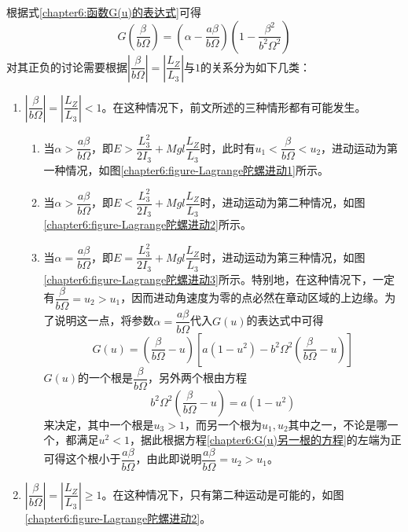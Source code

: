 根据式\eqref{chapter6:函数G(u)的表达式}可得
\begin{equation}
	G\left(\dfrac{\beta}{b\varOmega}\right)= \left(\alpha-\frac{a\beta}{b\varOmega}\right)\left(1-\dfrac{\beta^2}{b^2\varOmega^2}\right)
\end{equation}
对其正负的讨论需要根据$\left|\dfrac{\beta}{b\varOmega}\right|=\left|\dfrac{L_Z}{L_3}\right|$与$1$的关系分为如下几类：
\begin{enumerate}
\item $\left|\dfrac{\beta}{b\varOmega}\right|=\left|\dfrac{L_Z}{L_3}\right|<1$。在这种情况下，前文所述的三种情形都有可能发生。
\begin{enumerate}
\item 当$\alpha>\dfrac{a\beta}{b\varOmega}$，即$E>\dfrac{L_3^2}{2I_3}+Mgl\dfrac{L_Z}{L_3}$时，此时有$u_1<\dfrac{\beta}{b\varOmega}<u_2$，进动运动为第一种情况，如图\ref{chapter6:figure-Lagrange陀螺进动1}所示。

\item 当$\alpha>\dfrac{a\beta}{b\varOmega}$，即$E<\dfrac{L_3^2}{2I_3}+Mgl\dfrac{L_Z}{L_3}$时，进动运动为第二种情况，如图\ref{chapter6:figure-Lagrange陀螺进动2}所示。

\item 当$\alpha=\dfrac{a\beta}{b\varOmega}$，即$E=\dfrac{L_3^2}{2I_3}+Mgl\dfrac{L_Z}{L_3}$时，进动运动为第三种情况，如图\ref{chapter6:figure-Lagrange陀螺进动3}所示。特别地，在这种情况下，一定有$\dfrac{\beta}{b\varOmega}=u_2>u_1$，因而进动角速度为零的点必然在章动区域的上边缘。为了说明这一点，将参数$\alpha=\dfrac{a\beta}{b\varOmega}$代入$G(u)$的表达式中可得
\begin{equation}
	G(u) = \left(\frac{\beta}{b\varOmega}-u\right)\left[a(1-u^2)-b^2\varOmega^2\left(\frac{\beta}{b\varOmega}-u\right)\right]
\end{equation}
$G(u)$的一个根是$\dfrac{\beta}{b\varOmega}$，另外两个根由方程
\begin{equation}
	b^2\varOmega^2\left(\frac{\beta}{b\varOmega}-u\right) = a(1-u^2)
	\label{chapter6:G(u)另一根的方程}
\end{equation}
来决定，其中一个根是$u_3>1$，而另一个根为$u_1,u_2$其中之一，不论是哪一个，都满足$u^2<1$，据此根据方程\eqref{chapter6:G(u)另一根的方程}的左端为正可得这个根小于$\dfrac{a\beta}{b\varOmega}$，由此即说明$\dfrac{a\beta}{b\varOmega}=u_2>u_1$。
\end{enumerate}

\item $\left|\dfrac{\beta}{b\varOmega}\right|=\left|\dfrac{L_Z}{L_3}\right|\geqslant 1$。在这种情况下，只有第二种运动是可能的，如图\ref{chapter6:figure-Lagrange陀螺进动2}。
\end{enumerate}

